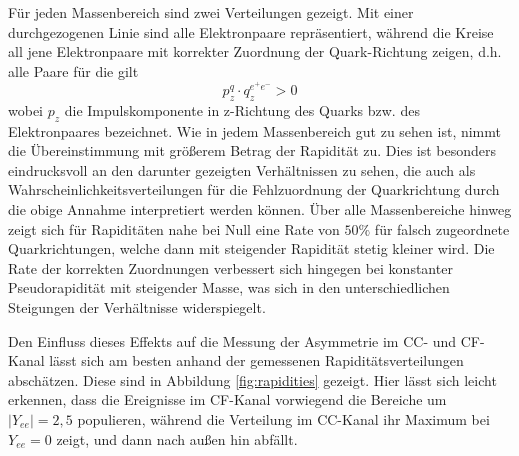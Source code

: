 Für jeden Massenbereich sind zwei Verteilungen gezeigt. Mit einer
durchgezogenen Linie sind alle Elektronpaare repräsentiert, während die Kreise
all jene Elektronpaare mit korrekter Zuordnung der Quark-Richtung zeigen, d.h.
alle Paare für die gilt
\begin{equation}
    p_z^q \cdot q_z^{e^+e^-} > 0
\end{equation}
wobei $p_z$ die Impulskomponente in z-Richtung des Quarks bzw. des
Elektronpaares bezeichnet.
Wie in jedem Massenbereich gut zu sehen ist, nimmt die Übereinstimmung mit
größerem Betrag der Rapidität zu. Dies ist besonders eindrucksvoll an den
darunter gezeigten Verhältnissen zu sehen, die auch als
Wahrscheinlichkeitsverteilungen für die Fehlzuordnung der Quarkrichtung durch
die obige Annahme interpretiert werden können. Über alle Massenbereiche hinweg
zeigt sich für Rapiditäten nahe bei Null eine Rate von $50\%$ für falsch
zugeordnete Quarkrichtungen, welche dann mit steigender Rapidität stetig
kleiner wird. Die Rate der korrekten Zuordnungen verbessert sich hingegen bei
konstanter Pseudorapidität mit steigender Masse, was sich in den
unterschiedlichen Steigungen der Verhältnisse widerspiegelt.
 
Den Einfluss dieses Effekts auf die Messung der Asymmetrie im \ac{CC}- und
\ac{CF}-Kanal lässt sich am besten anhand der gemessenen Rapiditätsverteilungen
abschätzen. Diese sind in Abbildung \ref{fig:rapidities} gezeigt. Hier lässt
sich leicht erkennen, dass die Ereignisse im \ac{CF}-Kanal vorwiegend die
Bereiche um $|Y_{ee}|=2,5$ populieren, während die Verteilung im \ac{CC}-Kanal
ihr Maximum bei $Y_{ee}=0$ zeigt, und dann nach außen hin abfällt.

